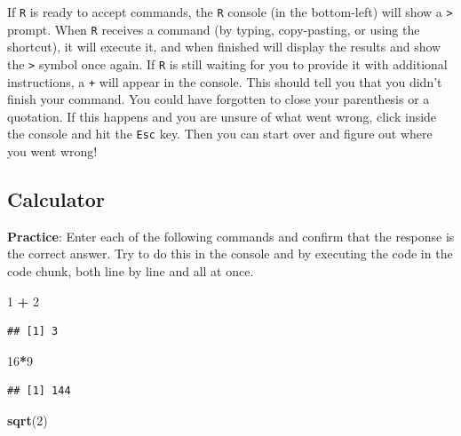 \documentclass[
  10pt,
  letterpaper,
  twoside,
  openright]{book}
\newenvironment{Shaded}{\begin{snugshade}}{\end{snugshade}}
\newcommand{\DecValTok}[1]{\textcolor[rgb]{0.00,0.00,0.81}{#1}}
\newcommand{\FunctionTok}[1]{\textcolor[rgb]{0.13,0.29,0.53}{\textbf{#1}}}
\newcommand{\NormalTok}[1]{#1}
\newcommand{\SpecialCharTok}[1]{\textcolor[rgb]{0.81,0.36,0.00}{\textbf{#1}}}
\begin{document}
If \texttt{R} is ready to accept commands, the \texttt{R} console (in
the bottom-left) will show a \texttt{\textgreater{}} prompt. When
\texttt{R} receives a command (by typing, copy-pasting, or using the
shortcut), it will execute it, and when finished will display the
results and show the \texttt{\textgreater{}} symbol once again. If
\texttt{R} is still waiting for you to provide it with additional
instructions, a \texttt{+} will appear in the console. This should tell
you that you didn't finish your command. You could have forgotten to
close your parenthesis or a quotation. If this happens and you are
unsure of what went wrong, click inside the console and hit the
\texttt{Esc} key. Then you can start over and figure out where you went
wrong!

\hypertarget{calculator}{%
\subsection{Calculator}\label{calculator}}

\textbf{Practice}: Enter each of the following commands and confirm that
the response is the correct answer. Try to do this in the console and by
executing the code in the code chunk, both line by line and all at once.

\begin{Shaded}
\begin{Highlighting}[]
\DecValTok{1} \SpecialCharTok{+} \DecValTok{2} 
\end{Highlighting}
\end{Shaded}

\begin{verbatim}
## [1] 3
\end{verbatim}

\begin{Shaded}
\begin{Highlighting}[]
\DecValTok{16}\SpecialCharTok{*}\DecValTok{9}
\end{Highlighting}
\end{Shaded}

\begin{verbatim}
## [1] 144
\end{verbatim}

\begin{Shaded}
\begin{Highlighting}[]
\FunctionTok{sqrt}\NormalTok{(}\DecValTok{2}\NormalTok{)}
\end{Highlighting}
\end{Shaded}
\end{document}
